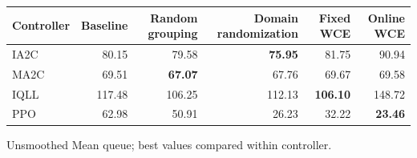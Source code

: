 \begin{tabular}{lrrrrr}
\hline
Controller & Baseline & Random grouping & Domain randomization & Fixed WCE & Online WCE \\
\hline
IA2C & 80.15 & 79.58 & \textbf{75.95} & 81.75 & 90.94 \\
MA2C & 69.51 & \textbf{67.07} & 67.76 & 69.67 & 69.58 \\
IQLL & 117.48 & 106.25 & 112.13 & \textbf{106.10} & 148.72 \\
PPO & 62.98 & 50.91 & 26.23 & 32.22 & \textbf{23.46} \\
\hline
\end{tabular}
Unsmoothed Mean queue; best values compared within controller.
